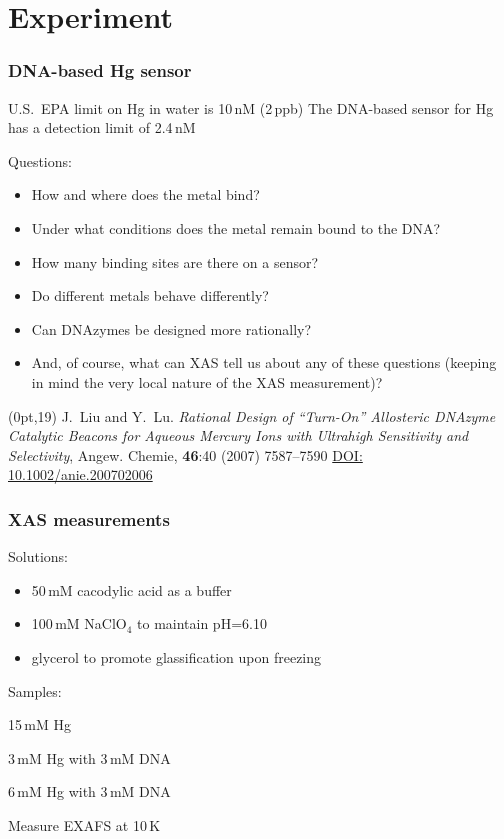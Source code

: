 \documentclass[10pt, xcolor=x11names, compress]{beamer}
\begin{document}
\section{Experiment}


\begin{frame}
  \frametitle{DNA-based Hg sensor}
  
  \begin{block}{U.S.\ EPA limit on Hg in water is 10\,nM (2\,ppb)}
    The DNA-based sensor for Hg has a detection limit of 2.4\,nM
  \end{block}

  Questions:
  \begin{itemize}
  \item How and where does the metal bind?
  \item Under what conditions does the metal remain bound to the
    DNA?
  \item How many binding sites are there on a sensor?
  \item Do different metals behave differently?
  \item Can DNAzymes be designed more rationally?
  \item And, of course, what can XAS tell us about any of these
    questions (keeping in mind the very local nature of the XAS
    measurement)?
  \end{itemize}


  \begin{textblock*}{0.7\linewidth}(0pt,19\TPVertModule)%
    \tiny J.\ Liu and Y.\ Lu. \textit{Rational Design of ``Turn-On''
      Allosteric DNAzyme Catalytic Beacons for Aqueous Mercury Ions
      with Ultrahigh Sensitivity and Selectivity}, Angew. Chemie,
    \textbf{46}:40 (2007) 7587--7590
    \href{http://dx.doi.org/10.1002/anie.200702006}{\color{Blue4}DOI:
      10.1002/anie.200702006}
  \end{textblock*}
\end{frame}

\begin{frame}
  \frametitle{XAS measurements}
  Solutions:
  \begin{itemize}
  \item 50\,mM \alert{cacodylic acid} as a buffer
  \item 100\,mM NaClO$_4$ to maintain pH=6.10
  \item glycerol to promote glassification upon freezing
  \end{itemize}

  \bigskip

  Samples:
  \begin{description}[~~~Control]
  \item[~~~Control] 15\,mM Hg
  \item[~~~Sample] 3\,mM Hg with 3\,mM DNA
  \item[~~~Sample with excess Hg] 6\,mM Hg with 3\,mM DNA
  \end{description}

  \bigskip

  \begin{block}{}
    \centering Measure EXAFS at 10\,K
  \end{block}
\end{frame}
\end{document}
